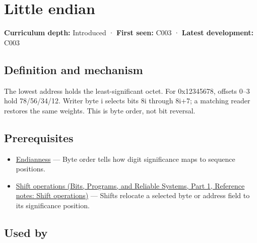 \hypertarget{appendix-367b6abf460e}{}\label{referencestart:appendix-367b6abf460e}
\section{Little endian}\label{appendix-367b6abf460e-little-endian}

\hypertarget{appendix-367b6abf460e-little-endian}{}

\textbf{Curriculum depth:} Introduced · \textbf{First seen:} C003 · \textbf{Latest development:} C003

\begin{allmightroledefinition}

\subsection{Definition and mechanism}\label{appendix-367b6abf460e-definition-and-mechanism}

\hypertarget{appendix-367b6abf460e-definition-and-mechanism}{}

The lowest address holds the least-significant octet. For 0x12345678, offsets 0--3 hold 78/56/34/12. Writer byte i selects bits 8i through 8i+7; a matching reader restores the same weights. This is byte order, not bit reversal.

\end{allmightroledefinition}

\subsection{Prerequisites}\label{appendix-367b6abf460e-prerequisites}

\hypertarget{appendix-367b6abf460e-prerequisites}{}

\begin{itemize}
\tightlist
\item
  \hyperref[appendix-bc07c3d25b18]{Endianness} --- Byte order tells how digit significance maps to sequence positions.
\item
  \href{../01-Bits-Programs-and-Reliable-Systems-P01/main.pdf\#nameddest=appendix-73425b25118e}{Shift operations (Bits, Programs, and Reliable Systems, Part 1, Reference notes: Shift operations)} --- Shifts relocate a selected byte or address field to its significance position.
\end{itemize}

\subsection{Used by}\label{appendix-367b6abf460e-used-by}

